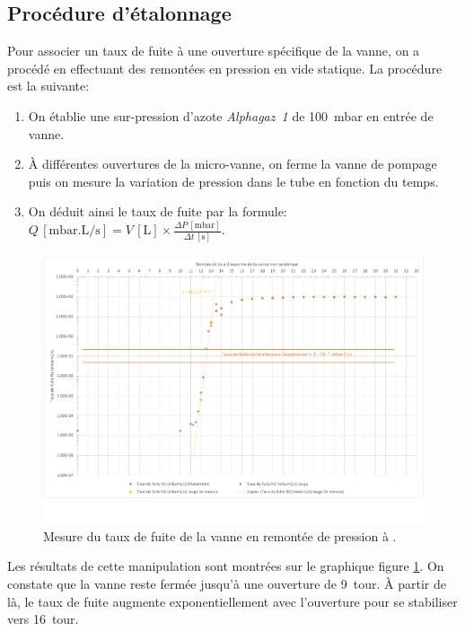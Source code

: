\subsection{Procédure d'étalonnage}
Pour associer un taux de fuite à une ouverture spécifique de la vanne, on a procédé en effectuant des remontées en pression en vide statique. La procédure est la suivante:
\begin{enumerate}
    \item On établie une sur-pression d'azote \textit{Alphagaz~1} de \SI{100}{\milli\bar} en entrée de vanne.
    \item À différentes ouvertures de la micro-vanne, on ferme la vanne de pompage puis on mesure la variation de pression dans le tube en fonction du temps.
    \item On déduit ainsi le taux de fuite par la formule: $\displaystyle  Q\,[\si{\milli\bar.\liter\per\second}] = V\,[\si{\liter}]\times\frac{\Delta P\,[\si{\milli\bar}]}{\Delta t\,[\si{\second}]}$.
\end{enumerate}

\begin{figure}
    \centering
    \includegraphics[trim = 0mm  19mm 0mm 0mm, clip, width=\textwidth]{Figures/Figures15032018_feuille10_testNouvelleGraphique5.pdf}
    \caption{Mesure du taux de fuite de la vanne en remontée de pression à .}
    \label{fig:graphCalVanne}
\end{figure}

Les résultats de cette manipulation sont montrées sur le graphique figure \ref{fig:graphCalVanne}. On constate que la vanne reste fermée jusqu'à une ouverture de \SI{9}{tour}. À partir de là, le taux de fuite augmente exponentiellement avec l'ouverture pour se stabiliser vers \SI{16}{tour}.

